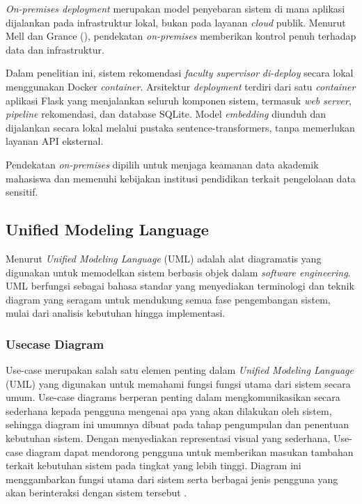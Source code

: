 \textit{On-premises deployment} merupakan model penyebaran sistem di mana aplikasi dijalankan pada infrastruktur lokal, bukan pada layanan \textit{cloud} publik. Menurut Mell dan Grance (\citeyear{mell2011nist}), pendekatan \textit{on-premises} memberikan kontrol penuh terhadap data dan infrastruktur.

Dalam penelitian ini, sistem rekomendasi \textit{faculty supervisor} \textit{di-deploy} secara lokal menggunakan Docker \textit{container}. Arsitektur \textit{deployment} terdiri dari satu \textit{container} aplikasi Flask yang menjalankan seluruh komponen sistem, termasuk \textit{web server}, \textit{pipeline} rekomendasi, dan database SQLite. Model \textit{embedding} diunduh dan dijalankan secara lokal melalui pustaka sentence-transformers, tanpa memerlukan layanan API eksternal.

Pendekatan \textit{on-premises} dipilih untuk menjaga keamanan data akademik mahasiswa dan memenuhi kebijakan institusi pendidikan terkait pengelolaan data sensitif.

\subsection{Unified Modeling Language}\label{unified-modeling-language}

Menurut \cite{dennis2020systems} \textit{Unified Modeling Language} (UML) adalah alat diagramatis yang digunakan untuk memodelkan sistem berbasis objek dalam \textit{software engineering}. UML berfungsi sebagai bahasa standar yang menyediakan terminologi dan teknik diagram yang seragam untuk mendukung semua fase pengembangan sistem, mulai dari analisis kebutuhan hingga implementasi.

\subsubsection{Usecase Diagram}\label{usecase-diagram}

Use-case merupakan salah satu elemen penting dalam \textit{Unified Modeling Language} (UML) yang digunakan untuk memahami fungsi fungsi utama dari sistem secara umum. Use-case diagrams berperan penting dalam mengkomunikasikan secara sederhana kepada pengguna mengenai apa yang akan dilakukan oleh sistem, sehingga diagram ini umumnya dibuat pada tahap pengumpulan dan penentuan kebutuhan sistem. Dengan menyediakan representasi visual yang sederhana, Use-case diagram dapat mendorong pengguna untuk memberikan masukan tambahan terkait kebutuhan sistem pada tingkat yang lebih tinggi. Diagram ini menggambarkan fungsi utama dari sistem serta berbagai jenis pengguna yang akan berinteraksi dengan sistem tersebut \cite{dennis2020systems}.


